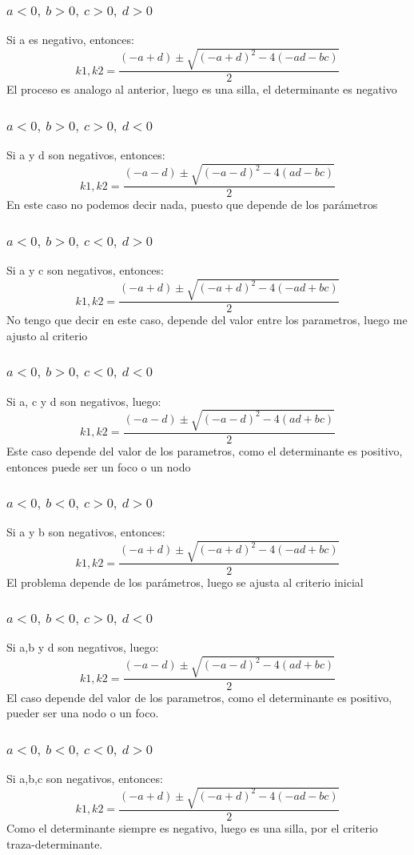 \documentclass[a4paper, 10pt]{article}
\begin{document}
\subsubsection{$a<0,\ b>0,\ c>0,\ d>0$} 
Si a es negativo, entonces:
$$ k1,k2 = \frac{(-a+d) \pm \sqrt{(-a+d)^2 -4(-ad - bc)} }{2}$$
El proceso es analogo al anterior, luego es una silla, el determinante es negativo
\subsubsection{$a<0,\ b>0,\ c>0,\ d<0$} 
Si a y d son negativos, entonces:
$$ k1,k2 = \frac{(-a-d) \pm \sqrt{(-a-d)^2 -4(ad - bc)} }{2}$$
En este caso no podemos decir nada, puesto que depende de los parámetros
\subsubsection{$a<0,\ b>0,\ c<0,\ d>0$} 
Si a y c son negativos, entonces:
$$ k1,k2 = \frac{(-a+d) \pm \sqrt{(-a+d)^2 -4(-ad + bc)} }{2}$$
No tengo que decir en este caso, depende del valor entre los parametros, luego me ajusto al criterio
\subsubsection{$a<0,\ b>0,\ c<0,\ d<0$} 
Si a, c y d son negativos, luego:
$$ k1,k2 = \frac{(-a-d) \pm \sqrt{(-a-d)^2 -4(ad + bc)} }{2}$$
Este caso depende del valor de los parametros, como el determinante es positivo,
entonces puede ser un foco o un nodo
\subsubsection{$a<0,\ b<0,\ c>0,\ d>0$} 
Si a y b son negativos, entonces:
$$ k1,k2 = \frac{(-a+d) \pm \sqrt{(-a+d)^2 -4(-ad + bc)} }{2}$$
El problema depende de los parámetros, luego se ajusta al criterio inicial
\subsubsection{$a<0,\ b<0,\ c>0,\ d<0$} 
Si a,b y d son negativos, luego:
$$ k1,k2 = \frac{(-a-d) \pm \sqrt{(-a-d)^2 -4(ad + bc)} }{2}$$
El caso depende del valor de los parametros, como el determinante es positivo,
pueder ser una nodo o un foco.
\subsubsection{$a<0,\ b<0,\ c<0,\ d>0$} 
Si a,b,c son negativos, entonces:
$$ k1,k2 = \frac{(-a+d) \pm \sqrt{(-a+d)^2 -4(-ad - bc)} }{2}$$
Como el determinante siempre es negativo, luego es una silla, por el criterio traza-determinante.
\end{document}
